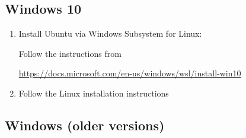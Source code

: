 \documentclass[%
 reprint,onecolumn,notitlepage,
superscriptaddress,longbibliography,
 amsmath,amssymb,
 aps,rmp,floatfix,
]{revtex4-1}
\begin{document}
\subsection{Windows 10}

\begin{enumerate}
    \item Install Ubuntu via Windows Subsystem for Linux:
    
    Follow the instructions from
    
    \url{https://docs.microsoft.com/en-us/windows/wsl/install-win10}
    
    \item Follow the Linux installation instructions
\end{enumerate}

\subsection{Windows (older versions)}
\end{document}
